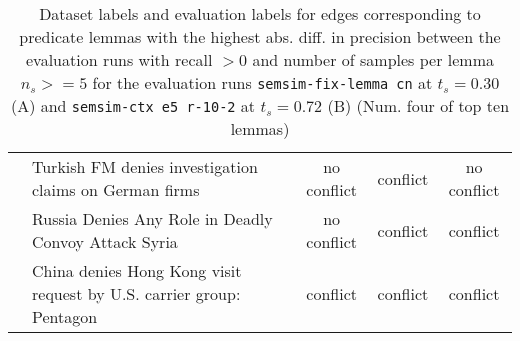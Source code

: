 \begin{sidewaystable}[ht]
\begin{tabular}{l p{13cm} ccc}
& Turkish FM denies investigation claims on German firms & no conflict & conflict & no conflict \\
& Russia Denies Any Role in Deadly Convoy Attack Syria & no conflict & conflict & conflict \\
& China denies Hong Kong visit request by U.S. carrier group: Pentagon & conflict & conflict & conflict \\
\bottomrule
\end{tabular}
\caption{Dataset labels and evaluation labels for edges corresponding to predicate lemmas with the highest abs. diff. in precision between the evaluation runs with recall \(> 0\) and number of samples per lemma \(n_s >= 5\) for the evaluation runs \texttt{semsim-fix-lemma cn} at \(t_s = 0.30\) (A) and \texttt{semsim-ctx e5 r-10-2} at \(t_s = 0.72\) (B)  (Num. four of top ten lemmas)}
\label{tab:ples-labels-2}
\end{sidewaystable}


